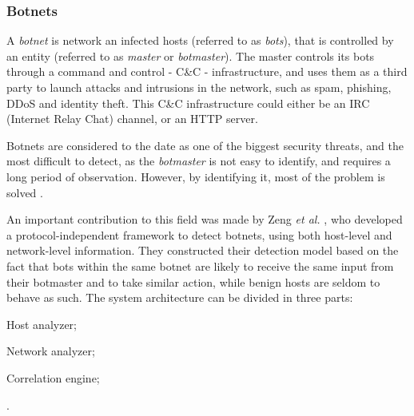\documentclass[runningheads,a4paper]{llncs}
\begin{document}
\subsubsection{Botnets}

A \textit{botnet} is network an infected hosts (referred to as \textit{bots}), that is controlled by an entity (referred to as \textit{master} or \textit{botmaster}). The master controls its bots through a command and control - C\&C - infrastructure, and uses them as a third party to launch attacks and intrusions in the network, such as spam, phishing, DDoS and identity theft. This C\&C infrastructure could either be an IRC (Internet Relay Chat) channel, or an HTTP server. 

Botnets are considered to the date as one of the biggest security threats, and the most difficult to detect, as the \textit{botmaster} is not easy to identify, and requires a long period of observation. However, by identifying it, most of the problem is solved \cite{Sperotto2010}. 


An important contribution to this field was made by Zeng \textit{et al.} \cite{Zeng2010}, who developed a protocol-independent framework to detect botnets, using both host-level and network-level information. They constructed their detection model based on the fact that bots within the same botnet are likely to receive the same input from their botmaster and to take similar action, while benign hosts are seldom to behave as such. The system architecture can be divided in three parts: 
\begin{enumerate*}
\item Host analyzer;
\item Network analyzer;
\item Correlation engine;
\end{enumerate*}.
\end{document}
